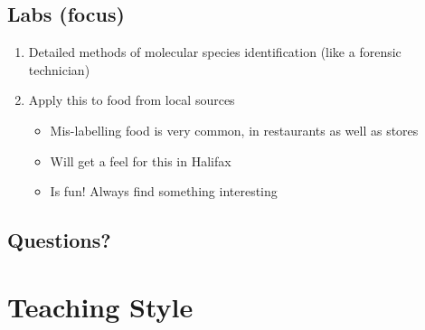 \documentclass[hidelinks]{article}
\begin{document}
	\subsection{Labs (focus)}
		\begin{enumerate}
			\item Detailed methods of molecular species identification (like a forensic technician)
			\item Apply this to food from local sources
				\begin{itemize}
					\item Mis-labelling food is very common, in restaurants as well as stores
					\item Will get a feel for this in Halifax
					\item Is fun! Always find something interesting
				\end{itemize}
		\end{enumerate}

		\subsection{Questions?}


\newpage
\section{Teaching Style}

\end{document}
